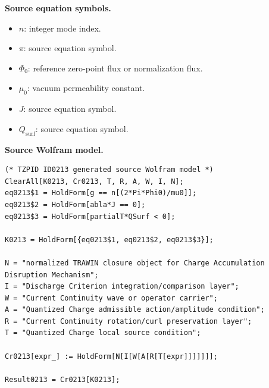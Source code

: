 \begin{minipage}[t]{0.49\linewidth}
\begingroup
\small
\raggedright
\textbf{Source equation symbols.}\par
\begin{itemize}[leftmargin=1.35em,itemsep=1pt,topsep=1pt,parsep=0pt]
    \item $n$: integer mode index.
    \item $\pi$: source equation symbol.
    \item $\Phi_0$: reference zero-point flux or normalization flux.
    \item $\mu_0$: vacuum permeability constant.
    \item $J$: source equation symbol.
    \item $Q_{\mathrm{surf}}$: source equation symbol.
\end{itemize}
\endgroup
\end{minipage}\hfill
\begin{minipage}[t]{0.47\linewidth}
\begingroup
\scriptsize
\raggedright
\textbf{Source Wolfram model.}\par
\begin{Verbatim}[fontsize=\tiny,breaklines=true,breakanywhere=true]
(* TZPID ID0213 generated source Wolfram model *)
ClearAll[K0213, Cr0213, T, R, A, W, I, N];
eq0213$1 = HoldForm[g == n[(2*Pi*Phi0)/mu0]];
eq0213$2 = HoldForm[abla*J == 0];
eq0213$3 = HoldForm[partialT*QSurf < 0];

K0213 = HoldForm[{eq0213$1, eq0213$2, eq0213$3}];

N = "normalized TRAWIN closure object for Charge Accumulation Disruption Mechanism";
I = "Discharge Criterion integration/comparison layer";
W = "Current Continuity wave or operator carrier";
A = "Quantized Charge admissible action/amplitude condition";
R = "Current Continuity rotation/curl preservation layer";
T = "Quantized Charge local source condition";

Cr0213[expr_] := HoldForm[N[I[W[A[R[T[expr]]]]]]];

Result0213 = Cr0213[K0213];
\end{Verbatim}
\endgroup
\end{minipage}

